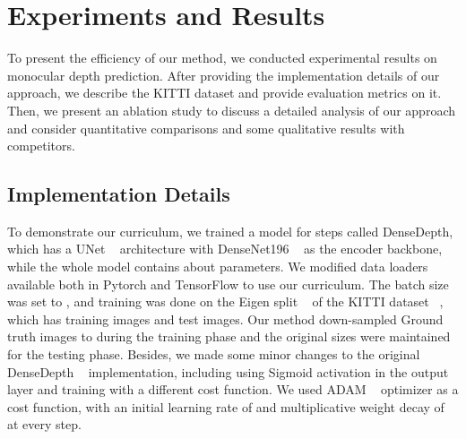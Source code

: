 \documentclass{article}
\begin{document}
\section{Experiments and Results}
\label{sec:results_eval}
To present the efficiency of our method, we conducted experimental results on monocular depth prediction. After providing the implementation details of our approach, we describe the KITTI dataset and provide evaluation metrics on it. Then, we present an ablation study to discuss a detailed analysis of our approach and consider quantitative comparisons and some qualitative results with competitors.

\subsection{Implementation Details}

To demonstrate our curriculum, we trained a model for  steps called DenseDepth, which has a UNet ~\cite{ronneberger2015u} architecture with DenseNet196 ~\cite{huang2017densely} as the encoder backbone, while the whole model contains about  parameters. We modified data loaders available both in Pytorch and TensorFlow to use our curriculum. The batch size was set to , and training was done on the Eigen split ~\cite{eigen} of the KITTI dataset ~\cite{geiger2013vision}, which has  training images and  test images. Our method down-sampled Ground truth images to  during the training phase and the original sizes were maintained for the testing phase. Besides, we made some minor changes to the original DenseDepth ~\cite{alhashim2018high} implementation, including using Sigmoid activation in the output layer and training with a different cost function. We used ADAM ~\cite{kingma2014adam} optimizer as a cost function, with an initial learning rate of  and multiplicative weight decay of  at every  step.
\end{document}
